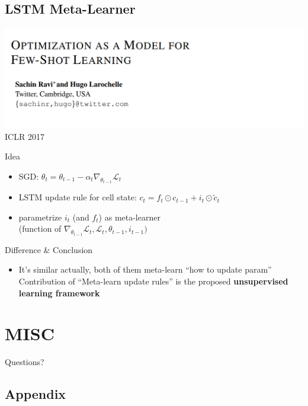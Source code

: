 \documentclass{beamer}
\newcommand{\weib}{\CJKfamily{weib}}
\begin{document}
\subsection{LSTM Meta-Learner}
\begin{frame}
  \includegraphics[width=\textwidth]{fig/LSTM-Meta-Learner.png}
  \center ICLR 2017
\end{frame}

\begin{frame}{Idea}
  \begin{itemize}
    \item SGD: $\theta_{t} = \theta_{t-1} - \alpha_t \nabla_{\theta_{t-1}} \mathcal{L}_t$
    \item LSTM update rule for cell state: $c_t = f_t \odot c_{t-1} + i_t \odot \tilde{c}_t$
    \item parametrize $i_t$ (and $f_t$) as meta-learner \\ 
      \quad \quad (function of $\nabla_{\theta_{t-1}}\mathcal{L}_t, \mathcal{L}_t, \theta_{t-1}, i_{t-1})$
  \end{itemize}
\end{frame}

\begin{frame}{Difference \& Conclusion}
  \begin{itemize}
    \item It's similar actually, both of them meta-learn ``how to update param''
    \quad \quad Contribution of ``Meta-learn update rules'' is the proposed \textbf{unsupervised learning framework}
  \end{itemize}
\end{frame}

\section{MISC}
\begin{frame}
	\begin{center}
    \LARGE{Questions?}
	\end{center}
\end{frame}


\subsection{Appendix}
\end{document}
